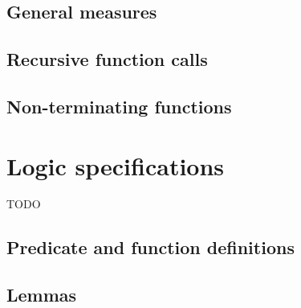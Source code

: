 \nodiff


\subsection{General measures}
\label{sec:generalmeasures}

\absent


\subsection{Recursive function calls}

\nodiff


\subsection{Non-terminating functions}
\label{sec:non-term-funct}

\absent


\section{Logic specifications}
\label{sec:logicspec}

TODO


\subsection{Predicate and function definitions}



\subsection{Lemmas}

